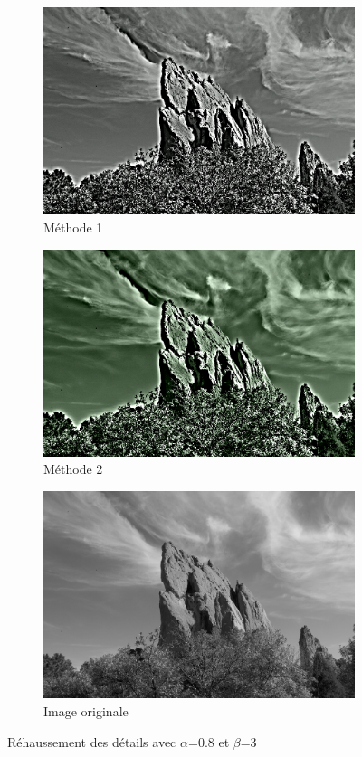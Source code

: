 \documentclass[twoside,UTF8]{EPURapport}
\begin{document}
\begin{figure}
        \centering
        \begin{subfigure}[b]{0.3\textwidth}
                \includegraphics[scale=0.4]{images/rock_input1_08_3.png} 
                \caption{Méthode 1}
        \end{subfigure}
        \qquad \qquad
        \begin{subfigure}[b]{0.3\textwidth}
                \includegraphics[scale=0.4]{images/rock_input2_08_3.png}
                \caption{Méthode 2}
        \end{subfigure}
        
        \begin{subfigure}[b]{0.3\textwidth}
                \includegraphics[scale=0.4]{images/rock_input.png}
             	\caption{Image originale}
        \end{subfigure}
        \caption{Réhaussement des détails avec $\alpha$=0.8 et $\beta$=3 }
\end{figure}
\end{document}
